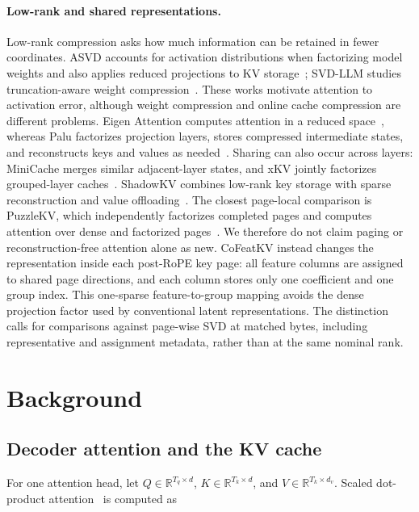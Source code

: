 \documentclass{article} %
\begin{document}
\paragraph{Low-rank and shared representations.} Low-rank compression asks how much information can be retained in fewer coordinates. ASVD accounts for activation distributions when factorizing model weights and also applies reduced projections to KV storage~\citep{asvd}; SVD-LLM studies truncation-aware weight compression~\citep{svdllm}. These works motivate attention to activation error, although weight compression and online cache compression are different problems. Eigen Attention computes attention in a reduced space~\citep{eigenattention}, whereas Palu factorizes projection layers, stores compressed intermediate states, and reconstructs keys and values as needed~\citep{palu}. Sharing can also occur across layers: MiniCache merges similar adjacent-layer states, and xKV jointly factorizes grouped-layer caches~\citep{minicache,xkv}. ShadowKV combines low-rank key storage with sparse reconstruction and value offloading~\citep{shadowkv}. The closest page-local comparison is PuzzleKV, which independently factorizes completed pages and computes attention over dense and factorized pages~\citep{puzzlekv}. We therefore do not claim paging or reconstruction-free attention alone as new. CoFeatKV instead changes the representation inside each post-RoPE key page: all feature columns are assigned to shared page directions, and each column stores only one coefficient and one group index. This one-sparse feature-to-group mapping avoids the dense projection factor used by conventional latent representations. The distinction calls for comparisons against page-wise SVD at matched bytes, including representative and assignment metadata, rather than at the same nominal rank.

\section{Background}
\label{sec:background}

\subsection{Decoder attention and the KV cache}

For one attention head, let
$Q\in\mathbb{R}^{T_q\times d}$,
$K\in\mathbb{R}^{T_k\times d}$, and
$V\in\mathbb{R}^{T_k\times d_v}$.
Scaled dot-product attention~\citep{transformer} is computed as
\end{document}
